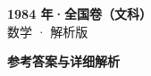 \documentclass[zihao=-4, a4paper]{ctexart}
\begin{document}
\begin{center}
  {\Large\bfseries 1984 年·全国卷（文科）}\\[4pt]
  {\large 数学 · 解析版}
\end{center}
\medskip
{}

\clearpage
{}
\begin{center}{\Large\bfseries 参考答案与详细解析}\end{center}
\medskip

\end{document}
